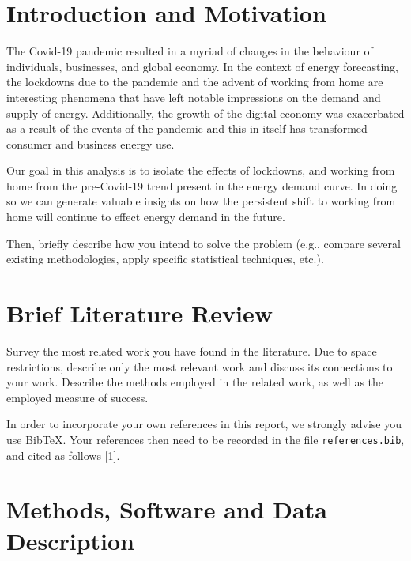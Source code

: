 \documentclass[mstat,12pt]{unswthesis}
\begin{document}
\hypertarget{introduction-and-motivation}{%
\section{Introduction and
Motivation}\label{introduction-and-motivation}}

The Covid-19 pandemic resulted in a myriad of changes in the behaviour
of individuals, businesses, and global economy. In the context of energy
forecasting, the lockdowns due to the pandemic and the advent of working
from home are interesting phenomena that have left notable impressions on the
demand and supply of energy. Additionally, the growth of the digital economy
was exacerbated as a result of the events of the pandemic and this in itself
has transformed consumer and business energy use.

Our goal in this analysis is to isolate the effects of lockdowns, and working
from home from the pre-Covid-19 trend present in the energy demand curve. In doing
so we can generate valuable insights on how the persistent shift to working from
home will continue to effect energy demand in the future.

\bigskip

Then, briefly describe how you intend to solve the problem (e.g.,
compare several existing methodologies, apply specific statistical
techniques, etc.).

\hypertarget{brief-literature-review}{%
\section{Brief Literature Review}\label{brief-literature-review}}

Survey the most related work you have found in the literature. Due to
space restrictions, describe only the most relevant work and discuss its
connections to your work. Describe the methods employed in the related
work, as well as the employed measure of success.

\bigskip

In order to incorporate your own references in this report, we strongly
advise you use BibTeX. Your references then need to be recorded in the
file \texttt{references.bib}, and cited as follows {[}1{]}.

\hypertarget{methods-software-and-data-description}{%
\section{Methods, Software and Data
Description}\label{methods-software-and-data-description}}
\end{document}
